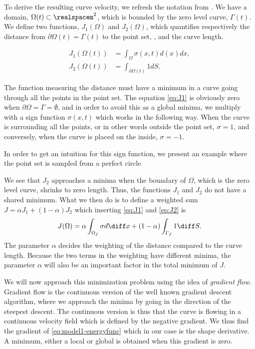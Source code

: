 
To derive the resulting curve velocity, we refresh the notation from . We have a domain, $\Omega(t) \subset \realspacem^2$, which is bounded by the zero level curve, $\Gamma(t)$. We define two functions, $J_1(\Omega)$ and $J_2(\Omega)$, which quantifies respectively the distance from $\partial \Omega(t)=\Gamma(t)$ to the point set, \pointset, and the curve length.

\begin{align}
    J_1(\Omega(t)) &= \int_{\Omega}\sigma(x, t)d(x) dx, \label{eq:J1}\\
    J_2(\Omega(t)) &= \int_{\partial \Omega(t)}1 dS.\label{eq:J2}
\end{align}

The function measuring the distance must have a minimum in a curve going through all the points in the point set. The equation \eqref{eq:J1} is obviously zero when $\partial \Omega=\Gamma=\emptyset$, and in order to avoid this as a global minima, we multiply with a sign function $\sigma(x, t)$ which works in the following way. When the curve is surrounding all the points, or in other words outside the point set, $\sigma=1$, and conversely, when the curve is placed on the inside, $\sigma=-1$.

In order to get an intuition for this sign function, we present an example where the point set is sampled from a perfect circle 

We see that $J_2$ approaches a minima when the boundary of $\Omega$, which is the zero level curve, shrinks to zero length. Thus, the functions $J_1$ and $J_2$ do not have a shared minimum. What we then do is to define a weighted sum $J = \alpha J_1 + (1-\alpha) J_2$ which inserting \eqref{eq:J1} and \eqref{eq:J2} is
\begin{equation}
    J(\Omega) = \alpha \int_{\Omega_f}\sigma d \diff x + (1-\alpha) \int_{\Gamma_f} 1 \diff S.
    \label{eq:model1-energyfunc}
\end{equation}
The parameter $\alpha$ decides the weighting of the distance compared to the curve length. Because the two terms in the weighting have different minima, the parameter $\alpha$ will also be an important factor in the total minimum of $J$.

We will now approach this minimization problem using the idea of \textit{gradient flow}. Gradient flow is the continuous version of the well known gradient descent algorithm, where we approach the minima by going in the direction of the steepest descent. The continuous version is thus that the curve is flowing in a continuous velocity field which is defined by the negative gradient.  We thus find the gradient of \eqref{eq:model1-energyfunc} which in our case is the shape derivative. A minimum, either a local or global is obtained when this gradient is zero. 

